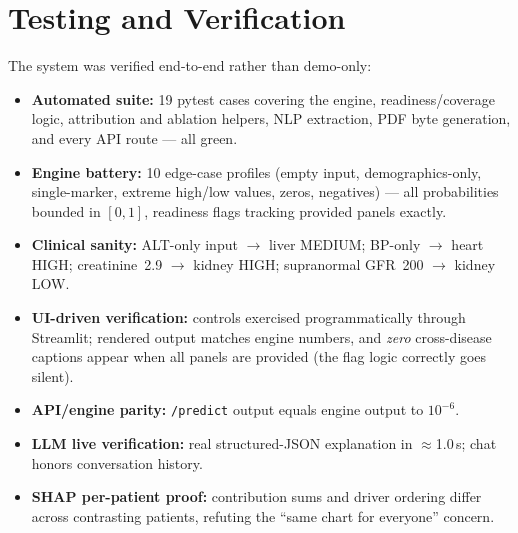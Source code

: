 \documentclass[journal]{IEEEtran}
\begin{document}
\section{Testing and Verification}
The system was verified end-to-end rather than demo-only:
\begin{itemize}
    \item \textbf{Automated suite:} 19 pytest cases covering the engine, readiness/coverage logic, attribution and ablation helpers, NLP extraction, PDF byte generation, and every API route --- all green.
    \item \textbf{Engine battery:} 10 edge-case profiles (empty input, demographics-only, single-marker, extreme high/low values, zeros, negatives) --- all probabilities bounded in $[0,1]$, readiness flags tracking provided panels exactly.
    \item \textbf{Clinical sanity:} ALT-only input $\to$ liver MEDIUM; BP-only $\to$ heart HIGH; creatinine~2.9 $\to$ kidney HIGH; supranormal GFR~200 $\to$ kidney LOW.
    \item \textbf{UI-driven verification:} controls exercised programmatically through Streamlit; rendered output matches engine numbers, and \emph{zero} cross-disease captions appear when all panels are provided (the flag logic correctly goes silent).
    \item \textbf{API/engine parity:} \texttt{/predict} output equals engine output to $10^{-6}$.
    \item \textbf{LLM live verification:} real structured-JSON explanation in $\approx$1.0\,s; chat honors conversation history.
    \item \textbf{SHAP per-patient proof:} contribution sums and driver ordering differ across contrasting patients, refuting the ``same chart for everyone'' concern.
\end{itemize}

\end{document}
